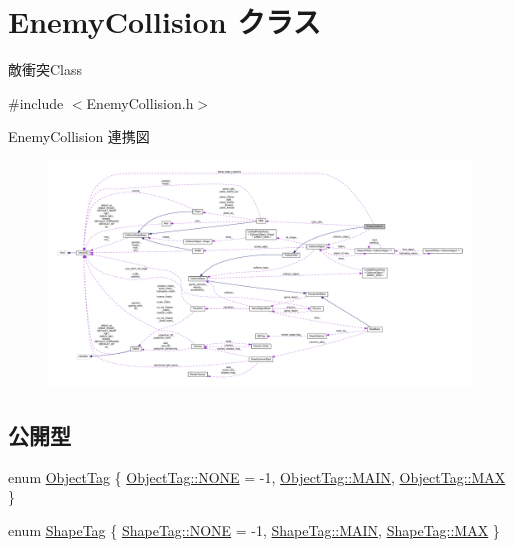 \hypertarget{class_enemy_collision}{}\section{Enemy\+Collision クラス}
\label{class_enemy_collision}


敵衝突\+Class  




{\ttfamily \#include $<$Enemy\+Collision.\+h$>$}



Enemy\+Collision 連携図\nopagebreak
\begin{figure}[H]
\begin{center}
\leavevmode
\includegraphics[width=350pt]{class_enemy_collision__coll__graph}
\end{center}
\end{figure}
\subsection*{公開型}
\begin{DoxyCompactItemize}
\item 
enum \mbox{\hyperlink{class_enemy_collision_a8423c2c1dce9ba8ab2ba9bed82ee4843}{Object\+Tag}} \{ \mbox{\hyperlink{class_enemy_collision_a8423c2c1dce9ba8ab2ba9bed82ee4843ab50339a10e1de285ac99d4c3990b8693}{Object\+Tag\+::\+N\+O\+NE}} = -\/1, 
\mbox{\hyperlink{class_enemy_collision_a8423c2c1dce9ba8ab2ba9bed82ee4843a186495f7da296bf880df3a22a492b378}{Object\+Tag\+::\+M\+A\+IN}}, 
\mbox{\hyperlink{class_enemy_collision_a8423c2c1dce9ba8ab2ba9bed82ee4843a26a4b44a837bf97b972628509912b4a5}{Object\+Tag\+::\+M\+AX}}
 \}
\item 
enum \mbox{\hyperlink{class_enemy_collision_a9aaccd825f08eb5db07e51feaf609e35}{Shape\+Tag}} \{ \mbox{\hyperlink{class_enemy_collision_a9aaccd825f08eb5db07e51feaf609e35ab50339a10e1de285ac99d4c3990b8693}{Shape\+Tag\+::\+N\+O\+NE}} = -\/1, 
\mbox{\hyperlink{class_enemy_collision_a9aaccd825f08eb5db07e51feaf609e35a186495f7da296bf880df3a22a492b378}{Shape\+Tag\+::\+M\+A\+IN}}, 
\mbox{\hyperlink{class_enemy_collision_a9aaccd825f08eb5db07e51feaf609e35a26a4b44a837bf97b972628509912b4a5}{Shape\+Tag\+::\+M\+AX}}
 \}
\end{DoxyCompactItemize}
